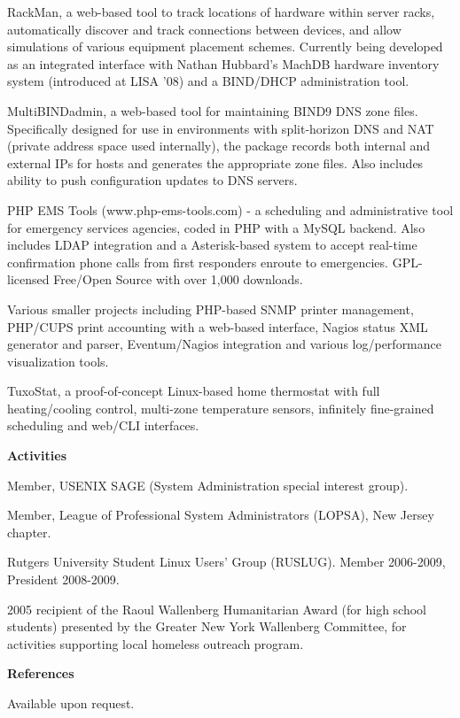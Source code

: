 \documentclass[letterpaper,11pt]{article}
\newcommand{\resheading}[1]{{\large \colorbox{mygrey}{\begin{minipage}{\textwidth}{\textbf{#1 \vphantom{p\^{E}}}}\end{minipage}}}}
\begin{document}
\begin{description}
\item[In Progress] RackMan, a web-based tool to track locations of hardware
  within server racks, automatically discover and track connections between
  devices, and allow simulations of various equipment placement
  schemes. Currently being developed as an integrated interface with Nathan
  Hubbard's MachDB hardware inventory system (introduced at LISA '08) and a
  BIND/DHCP administration tool.
\item[In Progress] MultiBINDadmin, a web-based tool for maintaining BIND9 DNS
  zone files. Specifically designed for use in environments with split-horizon
  DNS and NAT (private address space used internally), the package records
  both internal and external IPs for hosts and generates the appropriate zone
  files. Also includes ability to push configuration updates to DNS servers.
\item[2007--Present] PHP EMS Tools (www.php-ems-tools.com) - a scheduling and
  administrative tool for emergency services agencies, coded in PHP with a MySQL
  backend. Also includes LDAP integration and a Asterisk-based system to accept
  real-time confirmation phone calls from first responders enroute to
  emergencies. GPL-licensed Free/Open Source with over 1,000 downloads.
\item Various smaller projects including PHP-based SNMP printer management,
  PHP/CUPS print accounting with a web-based interface, Nagios status XML
  generator and parser, Eventum/Nagios integration and various log/performance
  visualization tools.
\item TuxoStat, a proof-of-concept Linux-based home thermostat with full
  heating/cooling control, multi-zone temperature sensors, infinitely
  fine-grained scheduling and web/CLI interfaces.
\end{description}

\resheading{Activities}
	\begin{description}
		\item Member, USENIX SAGE (System Administration special
                  interest group).
                \item Member, League of Professional System Administrators
                  (LOPSA), New Jersey chapter.
                \item Rutgers University Student Linux Users' Group
                  (RUSLUG). Member 2006-2009, President 2008-2009.
                \item 2005 recipient of the Raoul Wallenberg Humanitarian
                  Award (for high school students) presented by the Greater
                  New York Wallenberg Committee, for activities supporting
                  local homeless outreach program.
	\end{description}

\resheading{References}
\begin{description}
\item{Available upon request.}
\end{description}
\end{document}
